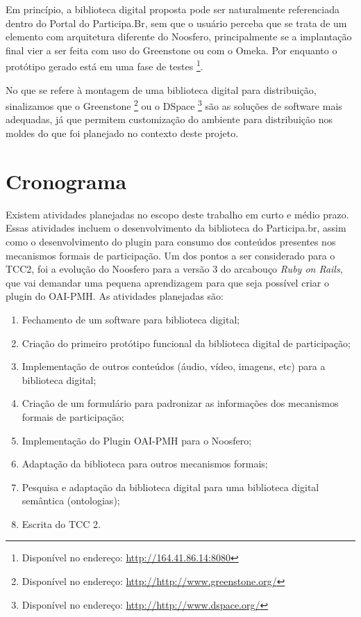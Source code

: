 Em princípio, a biblioteca digital proposta pode ser naturalmente referenciada dentro do Portal do Participa.Br, sem que o usuário perceba que se trata de um elemento com arquitetura diferente do Noosfero, principalmente se a implantação final vier a ser feita com uso do Greenstone ou com o Omeka. Por enquanto o protótipo gerado está em uma fase de testes \footnote{Disponível no endereço: \url{http://164.41.86.14:8080}}.

No que se refere à montagem de uma biblioteca digital para distribuição, sinalizamos que o Greenstone \footnote{Disponível no endereço: \url{http://http://www.greenstone.org/}} ou o DSpace \footnote{Disponível no endereço: \url{http://http://www.dspace.org/}} são as soluções de software mais adequadas, já que permitem customização do ambiente para distribuição nos moldes do que foi planejado no contexto deste projeto.


\section{Cronograma}

Existem atividades planejadas no escopo deste trabalho em curto e médio prazo. Essas atividades incluem o desenvolvimento da biblioteca do Participa.br, assim como o desenvolvimento do plugin para consumo dos conteúdos presentes nos mecanismos formais de participação. Um dos pontos a ser considerado para o TCC2, foi a evolução do Noosfero para a versão 3 do arcabouço \textit{Ruby on Rails}, que vai demandar uma pequena aprendizagem para que seja possível criar o plugin do OAI-PMH. As atividades planejadas são:

\begin{enumerate}
\item Fechamento de um software para biblioteca digital;
\item Criação do primeiro protótipo funcional da biblioteca digital de participação;
\item Implementação de outros conteúdos (áudio, vídeo, imagens, etc) para a biblioteca digital;
\item Criação de um formulário para padronizar as informações dos mecanismos formais de participação;
\item Implementação do Plugin OAI-PMH para o Noosfero;
\item Adaptação da biblioteca para outros mecanismos formais;
\item Pesquisa e adaptação da biblioteca digital para uma biblioteca digital semântica (ontologias);
\item Escrita do TCC 2.
\end{enumerate}

